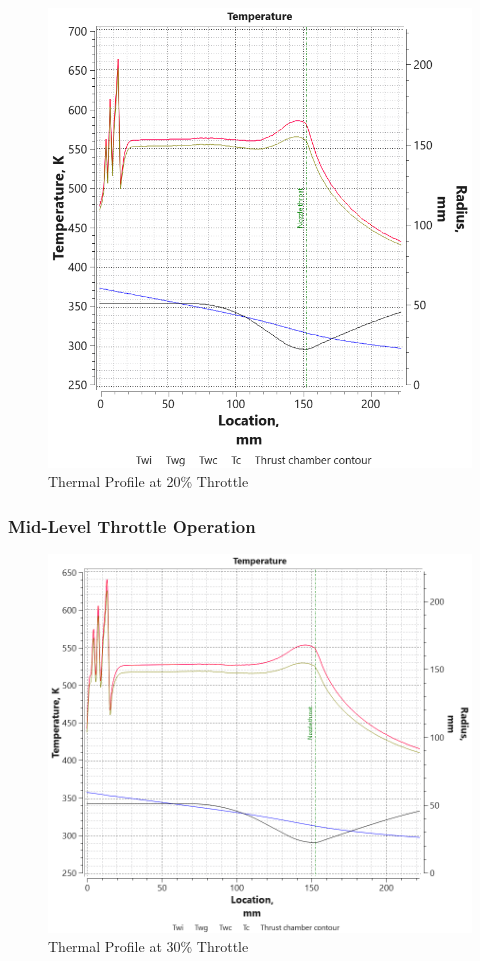 \begin{figure}[H]
    \centering
    \includegraphics[width=\linewidth]{Images/20_throttle_80_20_2film3.8of_4.8xfilm_aluminum_1.5mmwall_600Lstar_rao_55channels.png}
    \caption{Thermal Profile at 20\% Throttle}
    \label{fig:20_throttle}
\end{figure}

\subsubsection{Mid-Level Throttle Operation}
\begin{figure}[H]
    \centering
    \includegraphics[width=\linewidth]{Images/30_throttle_80_20_2film3.8of_4.8xfilm_aluminum_1.5mmwall_600Lstar_rao_55channels.png}
    \caption{Thermal Profile at 30\% Throttle}
    \label{fig:30_throttle}
\end{figure}

